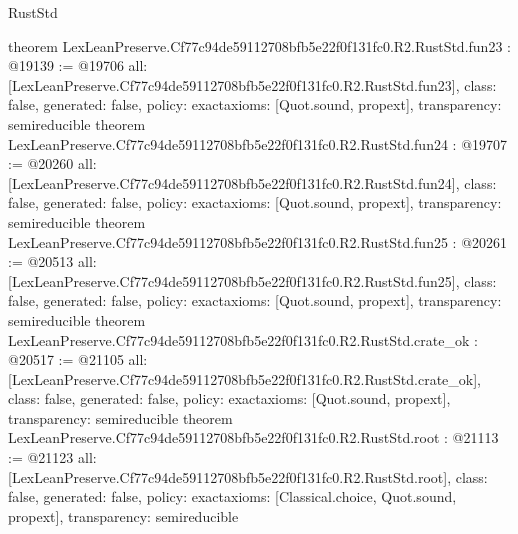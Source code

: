 \begin{lexlean}{RustStd}
\begin{coremodule}
{}
theorem LexLeanPreserve.Cf77c94de59112708bfb5e22f0f131fc0.R2.RustStd.fun23 : @19139 := @19706 {
  all: [LexLeanPreserve.Cf77c94de59112708bfb5e22f0f131fc0.R2.RustStd.fun23],
  class: false,
  generated: false,
  policy: exact{axioms: [Quot.sound, propext]},
  transparency: semireducible
}
theorem LexLeanPreserve.Cf77c94de59112708bfb5e22f0f131fc0.R2.RustStd.fun24 : @19707 := @20260 {
  all: [LexLeanPreserve.Cf77c94de59112708bfb5e22f0f131fc0.R2.RustStd.fun24],
  class: false,
  generated: false,
  policy: exact{axioms: [Quot.sound, propext]},
  transparency: semireducible
}
theorem LexLeanPreserve.Cf77c94de59112708bfb5e22f0f131fc0.R2.RustStd.fun25 : @20261 := @20513 {
  all: [LexLeanPreserve.Cf77c94de59112708bfb5e22f0f131fc0.R2.RustStd.fun25],
  class: false,
  generated: false,
  policy: exact{axioms: [Quot.sound, propext]},
  transparency: semireducible
}
theorem LexLeanPreserve.Cf77c94de59112708bfb5e22f0f131fc0.R2.RustStd.crate_ok : @20517 := @21105 {
  all: [LexLeanPreserve.Cf77c94de59112708bfb5e22f0f131fc0.R2.RustStd.crate_ok],
  class: false,
  generated: false,
  policy: exact{axioms: [Quot.sound, propext]},
  transparency: semireducible
}
theorem LexLeanPreserve.Cf77c94de59112708bfb5e22f0f131fc0.R2.RustStd.root : @21113 := @21123 {
  all: [LexLeanPreserve.Cf77c94de59112708bfb5e22f0f131fc0.R2.RustStd.root],
  class: false,
  generated: false,
  policy: exact{axioms: [Classical.choice, Quot.sound, propext]},
  transparency: semireducible
}


\end{coremodule}
\end{lexlean}
